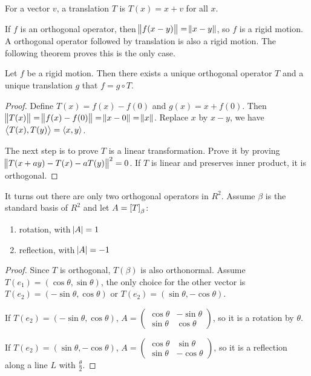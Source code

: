 \begin{definition}[Translation]
    For a vector $v$, a translation $T$ is $T(x) = x + v$ for all $x$.
\end{definition}

If $f$ is an orthogonal operator, then $\norm{f(x-y)} = \norm{x-y}$, so $f$ is a rigid motion. A orthogonal operator followed by translation is also a rigid motion. The following theorem proves this is the only case.

\begin{theorem}
    Let $f$ be a rigid motion. Then there exists a unique orthogonal operator $T$ and a unique translation $g$ that $f = g  \circ T$.
\end{theorem}
\begin{proof}
    Define $T(x) = f(x) - f(0)$ and $g(x) = x + f(0)$. Then $\norm{T(x)} = \norm{f(x) - f(0)} = \norm{x - 0} = \norm{x}$. Replace $x$ by $x-y$, we have $\left\langle \displaystyle T(x), T(y) \right\rangle = \left\langle \displaystyle x, y \right\rangle$.
    
    The next step is to prove $T$ is a linear transformation. Prove it by proving $\norm{T(x + a y) - T(x) - aT(y)}^2 = 0$. If $T$ is linear and preserves inner product, it is orthogonal.
\end{proof}


It turns out there are only two orthogonal operators in $R^2$. Assume $\beta$ is the standard basis of $R^2$ and let $A = \coordinate{T}_\beta$:
\begin{enumerate}
    \item rotation, with $\abs{A} = 1$
    \item reflection, with $\abs{A} = -1$
\end{enumerate}
\begin{proof}
    Since $T$ is orthogonal, $T(\beta)$ is also orthonormal. Assume $T(e_1) = (\cos \theta, \sin \theta)$, the only choice for the other vector is $T(e_2) = (- \sin \theta, \cos \theta)$ or $T(e_2) = (\sin \theta, - \cos \theta)$.
    
    If $T(e_2) = (- \sin \theta, \cos \theta)$, $A = \begin{pmatrix}
                \cos \theta & - \sin \theta \\
        \sin \theta & \cos \theta
    \end{pmatrix}$, so it is a rotation by $\theta$.
    
    If $T(e_2) = (\sin \theta, - \cos \theta)$, $A = \begin{pmatrix}
        \cos \theta & \sin \theta \\
        \sin \theta & -\cos \theta
    \end{pmatrix}$, so it is a reflection along a line $L$ with $\displaystyle \frac{\theta}{2}$.
\end{proof}

